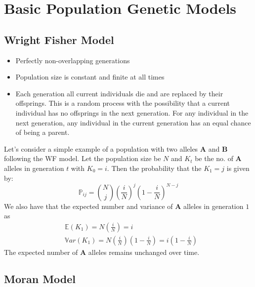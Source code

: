 \documentclass[
]{book}
\providecommand{\tightlist}{%
  \setlength{\itemsep}{0pt}\setlength{\parskip}{0pt}}
\theoremstyle{definition}
\theoremstyle{definition}
\theoremstyle{definition}
\theoremstyle{definition}
\theoremstyle{remark}
\begin{document}
\hypertarget{basic-population-genetic-models}{%
\section{Basic Population Genetic Models}\label{basic-population-genetic-models}}

\hypertarget{wright-fisher-model}{%
\subsection*{Wright Fisher Model}\label{wright-fisher-model}}

\begin{itemize}
\tightlist
\item
  Perfectly non-overlapping generations
\item
  Population size is constant and finite at all times
\item
  Each generation all current individuals die and are replaced by their offsprings. This is a random process with the possibility that a current individual has no offsprings in the next generation. For any individual in the next generation, any individual in the current generation has an equal chance of being a parent.
\end{itemize}

Let's consider a simple example of a population with two alleles \textbf{A} and \textbf{B} following the WF model. Let the population size be \(N\) and \(K_t\) be the no. of \textbf{A} alleles in generation \(t\) with \(K_0 = i\). Then the probability that the \(K_1 = j\) is given by: \[\mathbb{P}_{ij} = {N \choose j}\left(\frac{i}{N}\right)^j\left(1-\frac{i}{N}\right)^{N-j}\] We also have that the expected number and variance of \textbf{A} alleles in generation \(1\) as \[\begin{align*} & \mathbb{E}(K_1) = N\left(\frac{i}{N}\right) = i \\ & \mathbb{V}ar(K_1) = N \left(\frac{i}{N}\right) \left(1 - \frac{i}{N}\right) = i\left(1-\frac{i}{N}\right)  \end{align*}\] The expected number of \textbf{A} alleles remains unchanged over time.

\hypertarget{moran-model}{%
\subsection*{Moran Model}\label{moran-model}}
\end{document}
